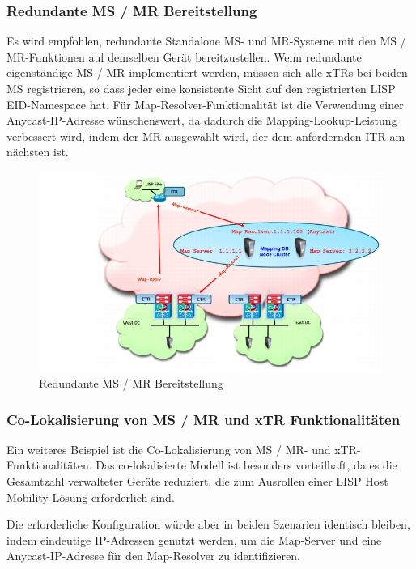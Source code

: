 \subsubsection{Redundante MS / MR Bereitstellung}

Es wird empfohlen, redundante Standalone MS- und MR-Systeme mit den MS / MR-Funktionen auf demselben Gerät bereitzustellen. Wenn redundante eigenständige MS / MR implementiert werden, müssen sich alle xTRs bei beiden MS registrieren, so dass jeder eine konsistente Sicht auf den registrierten LISP EID-Namespace hat. Für Map-Resolver-Funktionalität ist die Verwendung einer Anycast-IP-Adresse wünschenswert, da dadurch die Mapping-Lookup-Leistung verbessert wird, indem der MR ausgewählt wird, der dem anfordernden ITR am nächsten ist.

\begin{figure}[H]
	\centering
	\includegraphics[width=1\linewidth]{img/Absicherung/LISP-Example}
	\caption{Redundante MS / MR Bereitstellung \cite{LISP-mobility} }
	\label{fig:Redundante MS / MR Bereitstellung}
\end{figure}

\subsubsection{Co-Lokalisierung von MS / MR und xTR Funktionalitäten}

Ein weiteres Beispiel ist die Co-Lokalisierung  von MS / MR- und xTR-Funktionalitäten. Das co-lokalisierte Modell ist besonders vorteilhaft, da es die Gesamtzahl verwalteter Geräte reduziert, die zum Ausrollen einer LISP Host Mobility-Lösung erforderlich sind. 

Die erforderliche Konfiguration würde aber in beiden Szenarien identisch bleiben, indem eindeutige IP-Adressen genutzt werden, um die Map-Server und eine Anycast-IP-Adresse für den Map-Resolver zu identifizieren.

